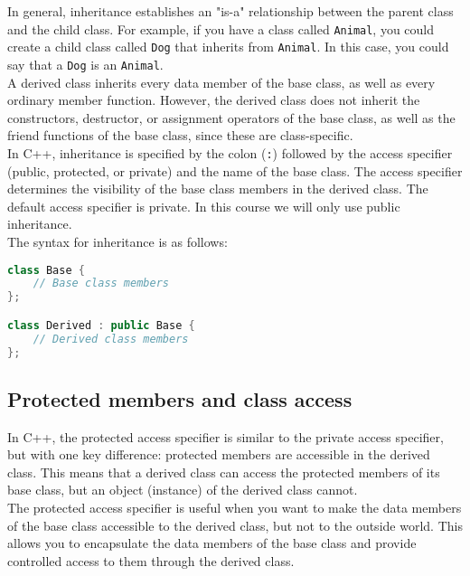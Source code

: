 In general, inheritance establishes an "is-a" relationship between the parent class and
the child class. For example, if you have a class called \texttt{Animal}, you could create
a child class called \texttt{Dog} that inherits from \texttt{Animal}. In this case, you could
say that a \texttt{Dog} is an \texttt{Animal}.\\

A derived class inherits every data member of the base class, as well as every ordinary
member function. However, the derived class does not inherit the constructors, 
destructor, or assignment operators of the base class, as well as the friend functions
of the base class, since these are class-specific.\\

In C++, inheritance is specified by the colon (\texttt{:}) followed by the access specifier
(public, protected, or private) and the name of the base class. The access specifier
determines the visibility of the base class members in the derived class. The default
access specifier is private. In this course we will only use public inheritance.\\

The syntax for inheritance is as follows:

\begin{lstlisting}[language=C++]
class Base {
    // Base class members
};

class Derived : public Base {
    // Derived class members
};
\end{lstlisting}

\subsection{Protected members and class access}

In C++, the protected access specifier is similar to the private access specifier, but
with one key difference: protected members are accessible in the derived class. This
means that a derived class can access the protected members of its base class, but an
object (instance) of the derived class cannot.\\

The protected access specifier is useful when you want to make the data members of the
base class accessible to the derived class, but not to the outside world. This allows
you to encapsulate the data members of the base class and provide controlled access to
them through the derived class.\\


